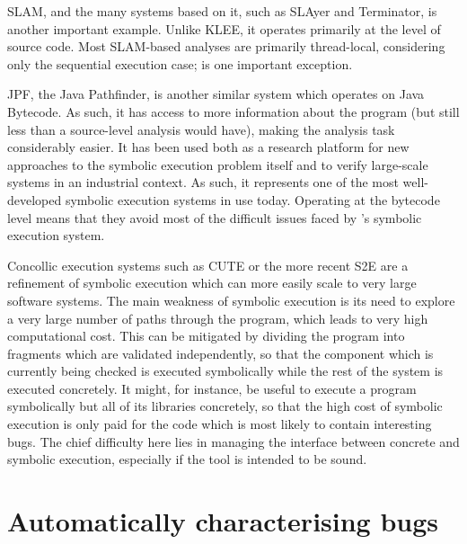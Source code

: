 SLAM\cite{Ball2011}, and the many systems based on it, such as
SLAyer\cite{Berdine2011} and Terminator\cite{Cook2006a}, is another
important example.  Unlike KLEE, it operates primarily at the level of
source code.  Most SLAM-based analyses are primarily thread-local,
considering only the sequential execution case; \cite{Cook2007} is one
important exception.  

JPF, the Java Pathfinder\cite{Havelund2000}, is another similar system
which operates on Java Bytecode\cite{Lindholm2013}.  As such, it has
access to more information about the program (but still less than a
source-level analysis would have), making the analysis task
considerably easier.  It has been used both as a research platform for
new approaches to the symbolic execution problem
itself\cite{D'Amorim2008,Gligoric2010} and to verify large-scale
systems in an industrial context\cite{PCZsCZreanu2008}.  As such, it
represents one of the most well-developed symbolic execution systems
in use today.  Operating at the bytecode level means that they avoid
most of the difficult issues faced by {\technique}'s symbolic
execution system.

Concollic execution systems such as CUTE\cite{Sen2005} or the more
recent S2E\cite{Chipounov2009} are a refinement of symbolic execution
which can more easily scale to very large software systems.  The main
weakness of symbolic execution is its need to explore a very large
number of paths through the program, which leads to very high
computational cost.  This can be mitigated by dividing the program
into fragments which are validated independently, so that the
component which is currently being checked is executed symbolically
while the rest of the system is executed concretely.  It might, for
instance, be useful to execute a program symbolically but all of its
libraries concretely, so that the high cost of symbolic execution is
only paid for the code which is most likely to contain interesting
bugs.  The chief difficulty here lies in managing the interface
between concrete and symbolic execution, especially if the tool is
intended to be sound.  

\nocite{Andrews2004}

\section{Automatically characterising bugs}
\label{sect:rw:auto_characterise}

